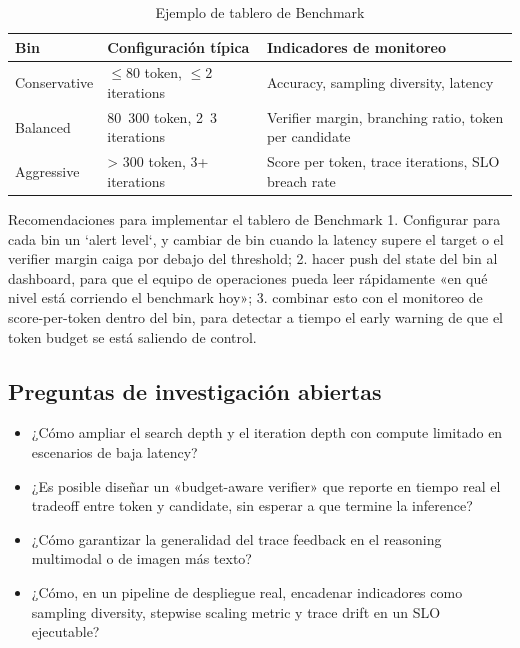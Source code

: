 \begin{table}[H]
\centering
\caption{Ejemplo de tablero de Benchmark}
\begin{tabular}{p{}p{}p{}}
\toprule
Bin & Configuración típica & Indicadores de monitoreo \\
\midrule
Conservative & $\leq 80$ token, $\leq 2$ iterations & Accuracy, sampling diversity, latency \\
Balanced & 80~300 token, 2~3 iterations & Verifier margin, branching ratio, token per candidate \\
Aggressive & > 300 token, 3+ iterations & Score per token, trace iterations, SLO breach rate \\
\bottomrule
\end{tabular}
\end{table}

\begin{importantbox}{Recomendaciones para implementar el tablero de Benchmark}
1. Configurar para cada bin un `alert level`, y cambiar de bin cuando la latency supere el target o el verifier margin caiga por debajo del threshold; 2. hacer push del state del bin al dashboard, para que el equipo de operaciones pueda leer rápidamente «en qué nivel está corriendo el benchmark hoy»; 3. combinar esto con el monitoreo de score-per-token dentro del bin, para detectar a tiempo el early warning de que el token budget se está saliendo de control.
\end{importantbox}

\subsection{Preguntas de investigación abiertas}
\begin{itemize}
\item ¿Cómo ampliar el search depth y el iteration depth con compute limitado en escenarios de baja latency?
\item ¿Es posible diseñar un «budget-aware verifier» que reporte en tiempo real el tradeoff entre token y candidate, sin esperar a que termine la inference?
\item ¿Cómo garantizar la generalidad del trace feedback en el reasoning multimodal o de imagen más texto?
\item ¿Cómo, en un pipeline de despliegue real, encadenar indicadores como sampling diversity, stepwise scaling metric y trace drift en un SLO ejecutable?
\end{itemize}

